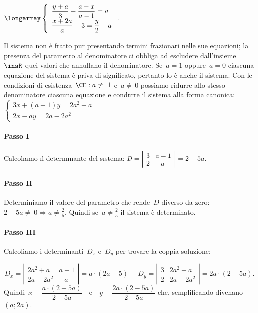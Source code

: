 \begin{exrig}\vspace{1.10ex}
\begin{esempio}
 $\longarray\left\{\begin{array}{l}{\dfrac{y+a}{3}-\dfrac{a-x}{a-1}=a}\\
 {\dfrac{x+2a}{a}-3=\dfrac{y}{2}-a}\end{array}\right..$

Il sistema non è fratto pur presentando termini frazionari nelle sue
equazioni; la presenza del parametro al denominatore ci obbliga ad
escludere dall'insieme~$\insR$ quei valori che annullano il
denominatore.
Se~$a=1$ oppure~$a=0$ ciascuna equazione del sistema è priva di
significato, pertanto lo è anche il sistema.
Con le condizioni di esistenza~$\CE: a\neq~1$ e~$a\neq~0$
possiamo ridurre allo stesso denominatore ciascuna equazione e condurre
il sistema alla forma
canonica:~$\left\{\begin{array}{l}{3x+(a-1)y=2a^{2}+a}\\{2x-ay=2a-2a^{2}}\end{array}\right.$


\paragraph{Passo I} Calcoliamo il determinante del sistema:
$D=\left|\begin{array}{cc}{3}&{a-1}\\{2}&{-a}\end{array}\right|=2-5a.$

\paragraph{Passo II} Determiniamo il valore del parametro che
rende~$D$ diverso da zero:~$2-5a\neq~0\Rightarrow a\neq \frac{2}{5}$. Quindi
se~$a\neq \frac{2}{5}$ il sistema è determinato.

\paragraph{Passo III} Calcoliamo i determinanti~$D_{x}$
e~$D_{y}$ per trovare la coppia soluzione:

\[D_{x}=\left|\begin{array}{cc}{2a^{2}+a}&{a-1}\\{2a-2a^{2}}&{-a}\end{array}\right|=a\cdot (2a-5);\quad
D_{y}=\left|\begin{array}{cc}{3}&{2a^{2}+a}\\{2}&{2a-2a^{2}}\end{array}\right|=2a\cdot (2-5a).\]
Quindi~$x=\dfrac{a\cdot (2-5a)}{2-5a}$~~e~~$y=\dfrac{2a\cdot (2-5a)}{2-5a}$ che, semplificando divenano~$(a;2a)$.


\end{esempio}
\end{exrig}

